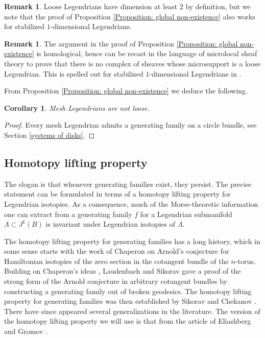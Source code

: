 \documentclass[JEP,XML,SOM,Unicode,NoFloatCountersInSection]{cedram}
\theoremstyle{plain}
\newtheorem{corollary}[theorem]{Corollary}
\theoremstyle{definition}
\newtheorem{remark}[theorem]{Remark}
\begin{document}
\begin{remark}
Loose Legendrians have dimension at least 2 by definition, but we note that the proof of Proposition \ref{Proposition: global non-existence} also works for stabilized $1$-dimensional Legendrians.
\end{remark}

\begin{remark}
The argument in the proof of Proposition \ref{Proposition: global non-existence} is homological, hence can be recast in the language of microlocal sheaf theory to prove that there is no complex of sheaves whose microsupport is a loose Legendrian. This is spelled out for stabilized $1$-dimensional Legendrians in \cite{STZ17}.
\end{remark}

From Proposition \ref{Proposition: global non-existence} we deduce the following.

\begin{corollary}
Mesh Legendrians are not loose.
\end{corollary}
\begin{proof} Every mesh Legendrian admits a generating family on a circle bundle, see Section \ref{systems of disks}.\end{proof}

\subsection{Homotopy lifting property}

The slogan is that whenever generating families exist, they persist. The precise statement can be formulated in terms of a homotopy lifting property for Legendrian isotopies. As a consequence, much of the Morse-theoretic information one can extract from a generating family $f$ for a Legendrian submanifold $\Lambda \subset J^1(B)$ is invariant under Legendrian isotopies of $\Lambda$.

The homotopy lifting property for generating families has a long history, which in some sense starts with the work of Chaperon on Arnold's conjecture for Hamiltonian isotopies of the zero section in the cotangent bundle of the $n$-torus. Building on Chaperon's ideas \cite{C84}, Laudenbach and Sikorav gave a proof of the strong form of the Arnold conjecture in arbitrary cotangent bundles \cite{LS85} by constructing a generating family out of broken geodesics. The homotopy lifting property for generating families was then established by Sikorav \cite{S86} and Chekanov \cite{C96}. There have since appeared several generalizations in the literature. The version of the homotopy lifting property we will use is that from the article of Eliashberg and Gromov \cite{EG98}.
\end{document}
